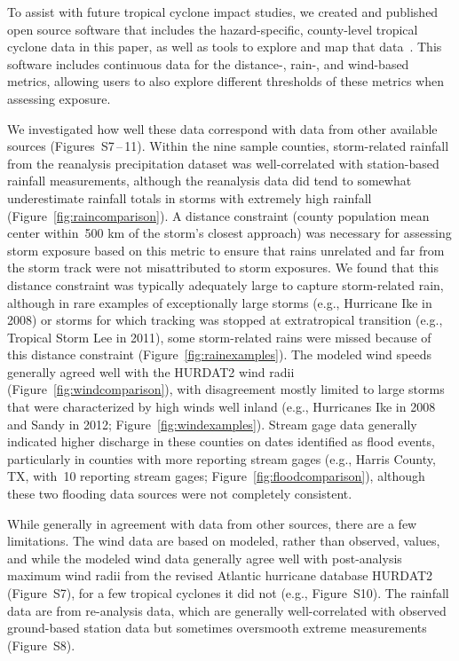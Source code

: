 To assist with future tropical cyclone impact studies, we created and published
open source software that includes the hazard-specific, county-level tropical
cyclone data in this paper, as well as tools to explore and map that 
data~\citep{hurricaneexposure, hurricaneexposuredata}. This software includes continuous
data for the distance-, rain-, and wind-based metrics, allowing users to also explore
different thresholds of these metrics when assessing exposure.

We investigated how well these data correspond with data from other available
sources (Figures~S7\,--\,11). Within the nine sample counties, storm-related
rainfall from the reanalysis precipitation dataset was well-correlated with
station-based rainfall measurements, although the reanalysis data did tend to
somewhat underestimate rainfall totals in storms with extremely high rainfall
(Figure~\ref{fig:raincomparison}). A distance constraint (county population
mean center within~500 \si{\kilo\metre} of the storm's closest approach) was
necessary for assessing storm exposure based on this metric to ensure that
rains unrelated and far from the storm track were not misattributed to storm
exposures. We found that this distance constraint was typically adequately
large to capture storm-related rain, although in rare examples of exceptionally
large storms (e.g., Hurricane Ike in 2008) or storms for which tracking was
stopped at extratropical transition (e.g., Tropical Storm Lee in 2011), some
storm-related rains were missed because of this distance constraint
(Figure~\ref{fig:rainexamples}).  The modeled wind speeds generally agreed well
with the \ac{HURDAT2} wind radii (Figure~\ref{fig:windcomparison}), with
disagreement mostly limited to large storms that were characterized by high
winds well inland (e.g., Hurricanes Ike in 2008 and Sandy in 2012;
Figure~\ref{fig:windexamples}).  Stream gage data generally indicated higher
discharge in these counties on dates identified as flood events, particularly
in counties with more reporting stream gages (e.g., Harris County, TX, with~10
reporting stream gages; Figure~\ref{fig:floodcomparison}), although these two
flooding data sources were not completely consistent.

While generally in agreement with data from other
sources, there are a few limitations. The wind data are based on modeled,
rather than observed, values, and while the modeled wind data generally agree
well with post-analysis maximum wind radii from the revised Atlantic hurricane
database \ac{HURDAT2}~\citep{landsea2013} (Figure~S7), for a few tropical cyclones
it did not (e.g., Figure~S10). The rainfall data are from re-analysis data,
which are generally well-correlated with observed ground-based station data but
sometimes oversmooth extreme measurements (Figure~S8). 
